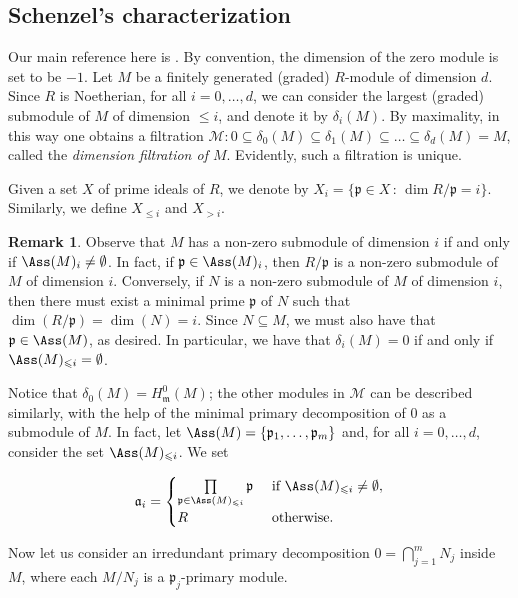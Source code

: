 \documentclass[12pt]{amsart}
\theoremstyle{definition}
\theoremstyle{definition}
\newtheorem{remark}[theorem]{Remark}
\def\frk{\mathfrak}               %
\def\aa{{\frk a}}
\def\mm{{\frk m}}
\def\pp{{\frk p}}
\renewcommand{\leq}{\leqslant}
\begin{document}
\subsection{ Schenzel's characterization} Our main reference here is \cite{Sch99}.
By convention, the dimension of the zero module is set to be $-1$. Let $M$ be a finitely generated (graded) $R$-module of dimension $d$. Since $R$ is Noetherian,  for all $i=0,\ldots,d$, we can consider the largest (graded) submodule of $M$ of dimension $\leq i$,  and denote it by $\delta_i(M)$. By maximality, in this way one obtains a filtration $\mathcal{M}: 0 \subseteq \delta_0(M) \subseteq \delta_1(M) \subseteq \ldots \subseteq \delta_d(M)=M$, called the {\em dimension filtration of $M$}. Evidently, such a filtration is unique. 

   Given a set $X$ of prime ideals of $R$, we denote by $X_i=\{\pp \in X \,:\, \dim R/\pp=i\}$. Similarly, we define $X_{\leq i}$ and $X_{>i}$. 

\begin{remark} \label{remark submodule dimension and Ass}
Observe that $M$ has a non-zero submodule of dimension $i$ if and only if $\Ass(M)_i \ne \emptyset$. In fact, if $\pp \in \Ass(M)_i$, then $R/\pp$ is a non-zero submodule of $M$ of dimension $i$. Conversely, if $N$ is a non-zero submodule of $M$ of dimension $i$, then there must exist a minimal prime $\pp$ of $N$ such that $\dim(R/\pp) = \dim(N) = i$. Since $N \subseteq M$, we must also have that $\pp \in \Ass(M)$, as desired. In particular, we have that $\delta_i(M) = 0$ if and only if $\Ass(M)_{\leq i} = \emptyset$.
\end{remark}

Notice that $\delta_0(M)=H^0_\mm(M)$; the other modules in $\mathcal{M}$ can be described similarly, with the help of the minimal primary decomposition of $0$ as a submodule of $M$. In fact, let $\Ass(M)=\{\pp_1,\ldots,\pp_m\}$ and, for all  $i=0,\ldots,d$,  consider the set $\Ass(M)_{\leq i}$. We set

\[
\aa_i = \begin{cases} \prod\limits_{\pp\in \Ass(M)_{\leq i}} \pp & \text{ if } \Ass(M)_{\leq i} \ne\emptyset,  \\ R & \text{ otherwise.}
\end{cases}
\]


Now let us consider an irredundant primary decomposition $0 = \bigcap_{j=1}^m N_j$ inside $M$, where each $M/N_j$ is a $\pp_j$-primary module. 
\end{document}
